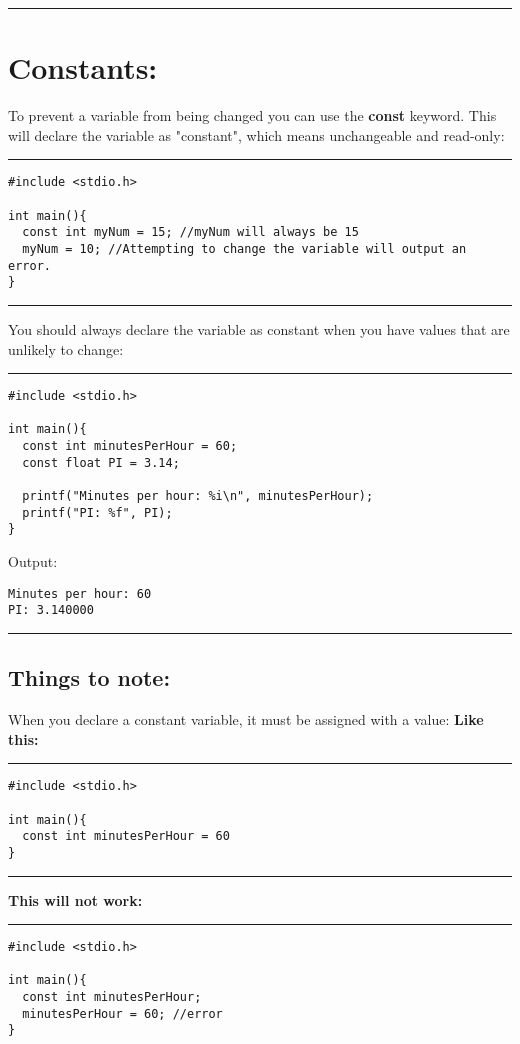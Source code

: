 \documentclass[a4paper]{article}
\begin{document}
\noindent\rule{\textwidth}{0.5pt}
\clearpage
\section{Constants:}
\label{sec:org7ed90de}
To prevent a variable from being changed you can use the \textbf{const} keyword.
This will declare the variable as "constant", which means unchangeable and
read-only:

\noindent\rule{\textwidth}{0.5pt}
\begin{verbatim}
#include <stdio.h>

int main(){
  const int myNum = 15; //myNum will always be 15
  myNum = 10; //Attempting to change the variable will output an error.
}
\end{verbatim}

\noindent\rule{\textwidth}{0.5pt}

You should always declare the variable as constant when you have values that are
unlikely to change:

\noindent\rule{\textwidth}{0.5pt}
\begin{verbatim}
#include <stdio.h>

int main(){
  const int minutesPerHour = 60;
  const float PI = 3.14;

  printf("Minutes per hour: %i\n", minutesPerHour);
  printf("PI: %f", PI);
}
\end{verbatim}
Output:
\begin{verbatim}
Minutes per hour: 60
PI: 3.140000
\end{verbatim}

\noindent\rule{\textwidth}{0.5pt}

\subsection{Things to note:}
\label{sec:orgf829938}
When you declare a constant variable, it must be assigned with a value:
\textbf{Like this:}

\noindent\rule{\textwidth}{0.5pt}
\begin{verbatim}
#include <stdio.h>

int main(){
  const int minutesPerHour = 60
}
\end{verbatim}

\noindent\rule{\textwidth}{0.5pt}
\textbf{This will not work:}

\noindent\rule{\textwidth}{0.5pt}
\begin{verbatim}
#include <stdio.h>

int main(){
  const int minutesPerHour;
  minutesPerHour = 60; //error
}
\end{verbatim}
\end{document}
